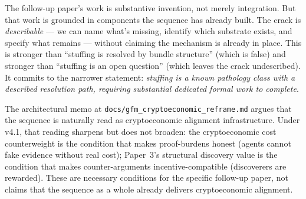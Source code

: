 \documentclass{article}
\begin{document}
The follow-up paper's work is substantive invention, not merely
integration.  But that work is grounded in components the
sequence has already built.  The crack is \emph{describable} ---
we can name what's missing, identify which substrate exists, and
specify what remains --- without claiming the mechanism is
already in place.  This is stronger than ``stuffing is resolved
by bundle structure'' (which is false) and stronger than
``stuffing is an open question'' (which leaves the crack
undescribed).  It commits to the narrower statement: \emph{
stuffing is a known pathology class with a described resolution
path, requiring substantial dedicated formal work to complete}.

The architectural memo at
\texttt{docs/gfm\_cryptoeconomic\_reframe.md} argues that the
sequence is naturally read as cryptoeconomic alignment
infrastructure.  Under v4.1, that reading sharpens but does not
broaden: the cryptoeconomic cost counterweight is the condition
that makes proof-burdens honest (agents cannot fake evidence
without real cost); Paper~3's structural discovery value is the
condition that makes counter-arguments incentive-compatible
(discoverers are rewarded).  These are necessary conditions for
the specific follow-up paper, not claims that the sequence as a
whole already delivers cryptoeconomic alignment.
\end{document}
